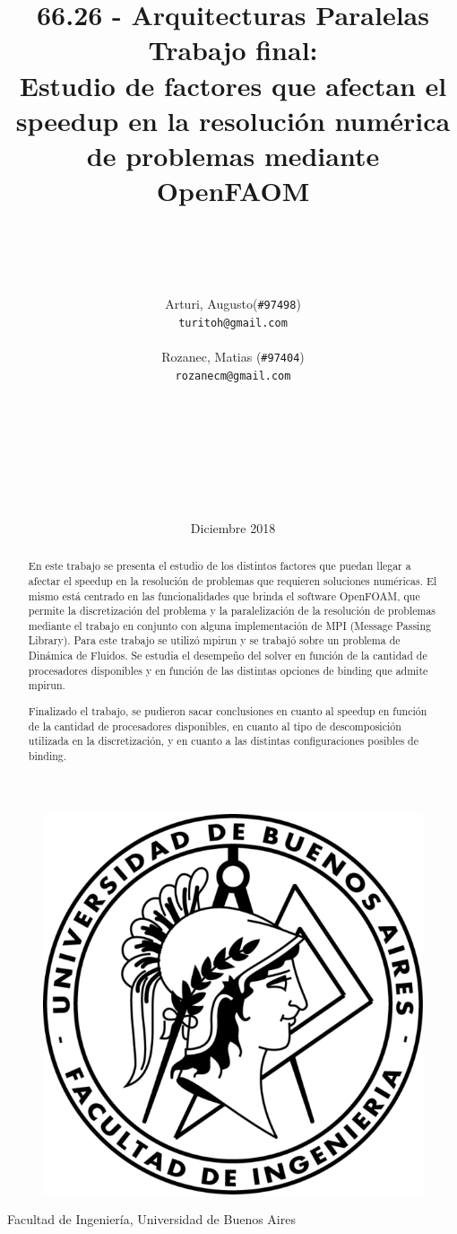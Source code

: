 \documentclass{article}
\title{66.26 - Arquitecturas Paralelas\\Trabajo final:\\Estudio de factores que afectan el speedup en la resolución numérica de problemas mediante OpenFAOM}
\author{
    \\\\\\\\
    Arturi, Augusto(\texttt{\#97498})\\\texttt{turitoh@gmail.com}\\
    \\
    Rozanec, Matias (\texttt{\#97404})\\\texttt{rozanecm@gmail.com}\\
    \\\\\\\\\\\\\\
}
\date{Diciembre 2018}
\begin{document}
\maketitle
\begin{figure}[!htp]
    \centering
    \includegraphics[scale=1]{../res/fiuba_logo.png} 
\end{figure}
\begin{center}\normalsize{Facultad de Ingeniería, Universidad de Buenos Aires}\end{center}
\newpage

\tableofcontents
\newpage

% 


\begin{abstract}
    En este trabajo se presenta el estudio de los distintos factores que puedan llegar a afectar el speedup en la resolución de problemas que requieren soluciones numéricas. El mismo está centrado en las funcionalidades que brinda el software OpenFOAM, que permite la discretización del problema y la paralelización de la resolución de problemas mediante el trabajo en conjunto con alguna implementación de MPI (Message Passing Library). Para este trabajo se utilizó mpirun y se trabajó sobre un problema de Dinámica de Fluidos. Se estudia el desempeño del solver en función de la cantidad de procesadores disponibles y en función de las distintas opciones de binding que admite mpirun. 

    Finalizado el trabajo, se pudieron sacar conclusiones en cuanto al speedup en función de la cantidad de procesadores disponibles, en cuanto al tipo de descomposición utilizada en la discretización, y en cuanto a las distintas configuraciones posibles de binding.

\end{abstract}
\newpage
\end{document}
